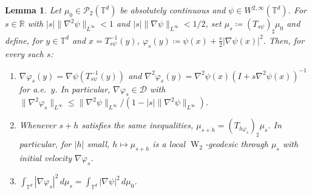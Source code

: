 \documentclass[11pt]{article}
\numberwithin{equation}{section}
\newtheorem{lemma}[theorem]{Lemma}
\theoremstyle{definition}
\newcommand{\R}{\mathbb{R}}
\newcommand{\T}{\mathbb{T}}
\newcommand{\Pcal}{\mathcal{P}}
\newcommand{\Wtwo}{\operatorname{W}_2}
\begin{document}
\begin{lemma}
    \label{lem:velocity_potential}
    Let $\mu_0 \in \Pcal_2(\T^d)$ be absolutely continuous and $\psi \in W^{2,\infty}(\T^d)$.
    For $s \in \R$ with $|s| \|\nabla^2\psi\|_{L^\infty} < 1$ and $|s| \|\nabla\psi\|_{L^\infty} < 1/2$, set $\mu_s \coloneqq (T_{s\psi})_\sharp\mu_0$ and define, for $y \in \T^d$ and $x = T_{s\psi}^{-1}(y)$, $\varphi_s(y) \coloneqq \psi(x) + \frac{s}{2}|\nabla\psi(x)|^2$.
    Then, for every such $s$:
    \begin{enumerate}[label=(\roman*)]
        \item $\nabla\varphi_s(y) = \nabla\psi\left(T_{s\psi}^{-1}(y)\right)$ and $\nabla^2\varphi_s(y) = \nabla^2 \psi(x) \left(I + s\nabla^2\psi(x)\right)^{-1}$ for a.e.\ $y$.
        In particular, $\nabla\varphi_s \in \mathscr{D}$ with $\|\nabla^2 \varphi_s\|_{L^\infty} \le \|\nabla^2\psi\|_{L^\infty}/(1-|s|\|\nabla^2\psi\|_{L^\infty})$.
        \item Whenever $s+h$ satisfies the same inequalities, $\mu_{s+h} = (T_{h\varphi_s})_\sharp\mu_s$.
        In particular, for $|h|$ small, $h \mapsto \mu_{s+h}$ is a local $\Wtwo$-geodesic through $\mu_s$ with initial velocity $\nabla\varphi_s$.
        \item $\displaystyle \int_{\T^d} |\nabla\varphi_s|^2 \, d\mu_s = \int_{\T^d} |\nabla\psi|^2 \, d\mu_0$.
    \end{enumerate}
\end{lemma}
\end{document}
